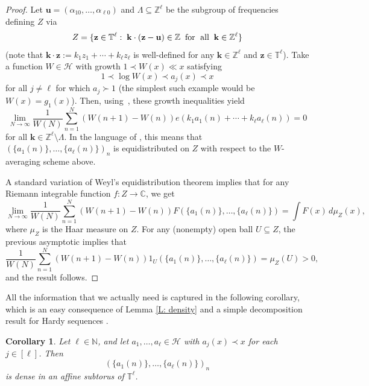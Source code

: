 \documentclass[11pt]{amsart}
\newtheorem{corollary}[lemma]{Corollary}
\theoremstyle{definition}
\newcommand{\C}{{\mathbb C}}
\newcommand{\N}{{\mathbb N}}
\newcommand{\T}{{\mathbb T}}
\newcommand{\Z}{{\mathbb Z}}
\newcommand{\CH}{{\mathcal H}}
\newcommand{\bk}{{\mathbf{k}}}
\newcommand{\bu}{{\mathbf{u}}}
\newcommand{\bz}{{\mathbf{z}}}
\newcommand{\1}{{\mathbf{1}}}
\begin{document}
\begin{proof} Let $\bu = (\alpha_{10}, \ldots, \alpha_{\ell 0})$ and $\Lambda\subseteq\Z^\ell$ be the subgroup of frequencies defining $Z$ via
\begin{align*}
    Z = \{\bz\in \T^\ell:\; \bk\cdot(\bz-\bu)\in\Z\;\; \textrm{for\; all}\;\; \bk\in \Z^\ell\}
\end{align*}
(note that $\bk\cdot\bz := k_1z_1 + \cdots + k_\ell z_\ell$ is well-defined for any $\bk\in\Z^\ell$ and $\bz\in\T^\ell$).
    Take a function $W\in\CH$ with growth $1\prec W(x) \ll x$ satisfying
    \begin{equation*}
        1\prec \log W(x)\prec a_j(x)\prec x
    \end{equation*}
    for all $j\neq \ell$ for which $a_j\succ 1$ (the simplest such example would be $W(x) = g_1(x)$). %
    Then, using~\cite[Theorem 5.1]{R22}, these growth inequalities yield 
    \begin{equation*}
     \lim\limits_{N\to\infty}   \frac{1}{W(N)}\sum_{n=1}^N \left(W(n+1)-W(n)\right)e\left(k_1a_1(n)+\cdots + k_\ell a_\ell(n)\right)=0
    \end{equation*}
    for all $\bk\in\Z^\ell\setminus{\Lambda}$. In the language of \cite{R22}, this means that $(\{a_1(n)\}, \ldots, \{a_\ell(n)\})_n$ is equidistributed on $Z$ with respect to the $W$-averaging scheme above. 

    A standard variation of Weyl's equidistribution theorem implies that for any Riemann integrable function $f: Z\to\C$, we get 
    $$\lim\limits_{N\to\infty}   \frac{1}{W(N)}\sum_{n=1}^N \left(W(n+1)-W(n)\right)F\left(\{a_1(n)\},\ldots, \{a_\ell(n)\}\right)=\int F(x)\,d\mu_Z(x),$$
    where $\mu_Z$ is the Haar measure on $Z$.
    For any (nonempty) open ball $U \subseteq Z$, the previous asymptotic implies that 
    \begin{equation*}
        \frac{1}{W(N)}\sum_{n=1}^N \left(W(n+1)-W(n)\right)1_U\left(\{a_1(n)\},\ldots, \{a_\ell(n)\}\right)=\mu_Z(U)>0,
    \end{equation*}
    and the result follows.
\end{proof}

All the information that we actually need is captured in the following corollary, which is an easy consequence of Lemma \ref{L: density} and a simple decomposition result for Hardy sequences \cite[Lemma A.3]{R22}. %
\begin{corollary}\label{C: density}
    Let $\ell\in\N$, and let $a_1, \ldots, a_\ell\in\CH$ with $a_j(x)\prec x$ for each $j\in[\ell]$. Then $$(\{a_1(n)\}, \ldots, \{a_\ell(n)\})_n$$ is dense in an affine subtorus of $\T^\ell$.
\end{corollary}
\end{document}
